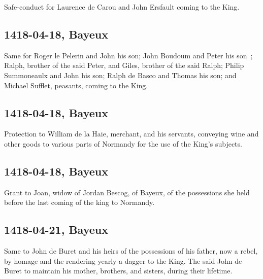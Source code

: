 \documentclass[a4paper,12pt,twoside]{book}
\begin{document}
                
                     Safe-conduct for Laurence de Carou and John Ersfault coming to the King.
                  
                
                \subsection{1418-04-18, Bayeux}
                
                
                     Same for Roger le Pelerin and John his son; John Boudoum and Peter his son ; Ralph, brother of the said Peter, and Giles, brother of the said Ralph; Philip Summoneaulx and John his son; Ralph de Basco and Thomas his son; and Michael Sufflet, peasants, coming to the King.
                  
                
                \subsection{1418-04-18, Bayeux}
                
                
                     Protection to William de la Haie, merchant, and his servants, conveying wine and other goods to various parts of Normandy for the use of the King's subjects.
                  
                
                \subsection{1418-04-18, Bayeux}
                
                
                     Grant to Joan, widow of Jordan Bescog, of Bayeux, of the possessions she held before the last coming of the king to Normandy.
                  
                
                \subsection{1418-04-21, Bayeux}
                
                
                     Same to John de Buret and his heirs of the possessions of his father, now a rebel, by homage and the rendering yearly a dagger to the King. The said John de Buret to maintain his mother, brothers, and sisters, during their lifetime.
                  
\end{document}
